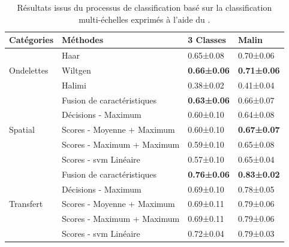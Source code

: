 \begin{table}[H]
    \centering
    \begin{tabular}{llll}
        \toprule
        Catégories                  & Méthodes                  & 3 Classes         & Malin             \\ \midrule
        \multirow{3}{*}{Ondelettes} & Haar                      & 0.65±0.08         & 0.70±0.06         \\
                                    & Wiltgen~\cite{Wiltgen2008}& \textbf{0.66±0.06}& \textbf{0.71±0.06}\\
                                    & Halimi~\cite{Halimi2017a} & 0.38±0.02         & 0.41±0.04         \\ \midrule
        \multirow{5}{*}{Spatial}    & Fusion de caractéristiques& \textbf{0.63±0.06}& 0.66±0.07         \\
                                    & Décisions - Maximum       & 0.60±0.10         & 0.64±0.08         \\
                                    & Scores - Moyenne + Maximum& 0.60±0.10         & \textbf{0.67±0.07}\\
                                    & Scores - Maximum + Maximum& 0.59±0.10         & 0.65±0.08         \\
                                    & Scores - \gls{svm} Linéaire& 0.57±0.10        & 0.65±0.04         \\ \midrule
        \multirow{5}{*}{Transfert}  & Fusion de caractéristiques& \textbf{0.76±0.06}& \textbf{0.83±0.02}\\
                                    & Décisions - Maximum       & 0.69±0.10         & 0.78±0.05         \\
                                    & Scores - Moyenne + Maximum& 0.69±0.11         & 0.79±0.06         \\
                                    & Scores - Maximum + Maximum& 0.69±0.11         & 0.79±0.06         \\
                                    & Scores - \gls{svm} Linéaire& 0.72±0.04        & 0.79±0.03         \\
        \bottomrule
    \end{tabular}
    \caption{Résultats issus du processus de classification basé sur la classification multi-échelles exprimés à l'aide du \fscore.}
    \vspace{-1em}
    \label{tab:results_image_improvement_multiresolution}
\end{table}

